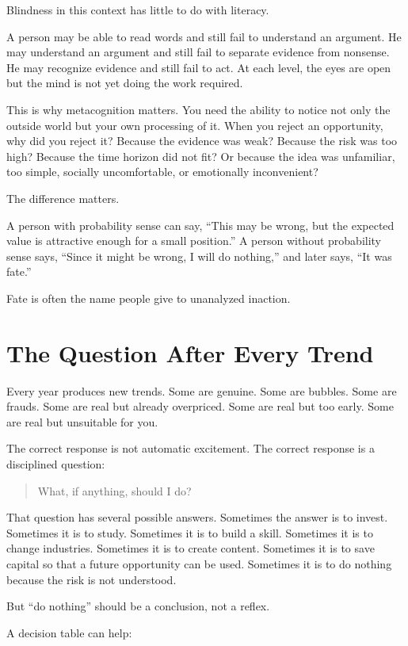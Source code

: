 Blindness in this context has little to do with literacy.

A person may be able to read words and still fail to understand an argument. He may understand an argument and still fail to separate evidence from nonsense. He may recognize evidence and still fail to act. At each level, the eyes are open but the mind is not yet doing the work required.

This is why metacognition matters. You need the ability to notice not only the outside world but your own processing of it. When you reject an opportunity, why did you reject it? Because the evidence was weak? Because the risk was too high? Because the time horizon did not fit? Or because the idea was unfamiliar, too simple, socially uncomfortable, or emotionally inconvenient?

The difference matters.

A person with probability sense can say, ``This may be wrong, but the expected value is attractive enough for a small position.'' A person without probability sense says, ``Since it might be wrong, I will do nothing,'' and later says, ``It was fate.''

Fate is often the name people give to unanalyzed inaction.

\section*{The Question After Every Trend}

Every year produces new trends. Some are genuine. Some are bubbles. Some are frauds. Some are real but already overpriced. Some are real but too early. Some are real but unsuitable for you.

The correct response is not automatic excitement. The correct response is a disciplined question:

\begin{quote}
What, if anything, should I do?
\end{quote}

That question has several possible answers. Sometimes the answer is to invest. Sometimes it is to study. Sometimes it is to build a skill. Sometimes it is to change industries. Sometimes it is to create content. Sometimes it is to save capital so that a future opportunity can be used. Sometimes it is to do nothing because the risk is not understood.

But ``do nothing'' should be a conclusion, not a reflex.

A decision table can help:

